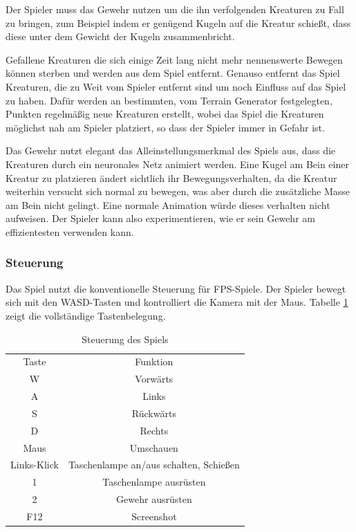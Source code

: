 Der Spieler muss das Gewehr nutzen um die ihn verfolgenden Kreaturen zu Fall zu bringen, zum Beispiel indem er genügend Kugeln auf die Kreatur schießt, dass diese unter dem Gewicht der Kugeln zusammenbricht.

Gefallene Kreaturen die sich einige Zeit lang nicht mehr nennenswerte Bewegen können sterben und werden aus dem Spiel entfernt.
Genauso entfernt das Spiel Kreaturen, die zu Weit vom Spieler entfernt sind um noch Einfluss auf das Spiel zu haben.
Dafür werden an bestimmten, vom Terrain Generator festgelegten, Punkten regelmäßig neue Kreaturen erstellt, wobei das Spiel die Kreaturen möglichst nah am Spieler platziert, so dass der Spieler immer in Gefahr ist.

Das Gewehr nutzt elegant das Alleinstellungsmerkmal des Spiels aus, dass die Kreaturen durch ein neuronales Netz animiert werden.
Eine Kugel am Bein einer Kreatur zu platzieren ändert sichtlich ihr Bewegungsverhalten, da die Kreatur weiterhin versucht sich normal zu bewegen, was aber durch die zusätzliche Masse am Bein nicht gelingt.
Eine normale Animation würde dieses verhalten nicht aufweisen.
Der Spieler kann also experimentieren, wie er sein Gewehr am effizientesten verwenden kann.

\subsubsection{Steuerung}

Das Spiel nutzt die konventionelle Steuerung für FPS-Spiele.
Der Spieler bewegt sich mit den WASD-Tasten und kontrolliert die Kamera mit der Maus. 
Tabelle \ref{tab:controls} zeigt die vollständige Tastenbelegung.

\begin{table}[]
    \centering
\begin{tabular}{c|c}
    Taste & Funktion \\
    W & Vorwärts\\
    A & Links\\
    S & Rückwärts\\
    D & Rechts\\
    Maus & Umschauen\\
    Links-Klick & Taschenlampe an/aus schalten, Schießen\\
    1 & Taschenlampe ausrüsten\\
    2 & Gewehr ausrüsten\\
    F12 & Screenshot
\end{tabular}
    \caption{Steuerung des Spiels}
    \label{tab:controls}
\end{table}

